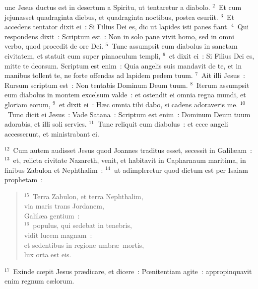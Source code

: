 \bchapter
{}unc Jesus ductus est in desertum a Spiritu, ut tentaretur a diabolo.
${}^{2}$~Et cum jejunasset quadraginta diebus, et quadraginta noctibus, postea esuriit.
${}^{3}$~Et accedens tentator dixit ei~: Si Filius Dei es, dic ut lapides isti panes fiant.
${}^{4}$~Qui respondens dixit~: Scriptum est~: Non in solo pane vivit homo, sed in omni verbo, quod procedit de ore Dei.
${}^{5}$~Tunc assumpsit eum diabolus in sanctam civitatem, et statuit eum super pinnaculum templi,
${}^{6}$~et dixit ei~: Si Filius Dei es, mitte te deorsum. Scriptum est enim~: Quia angelis suis mandavit de te, et in manibus tollent te, ne forte offendas ad lapidem pedem tuum.
${}^{7}$~Ait illi Jesus~: Rursum scriptum est~: Non tentabis Dominum Deum tuum.
${}^{8}$~Iterum assumpsit eum diabolus in montem excelsum valde~: et ostendit ei omnia regna mundi, et gloriam eorum,
${}^{9}$~et dixit ei~: H\ae c omnia tibi dabo, si cadens adoraveris me.
${}^{10}$~Tunc dicit ei Jesus~: Vade Satana~: Scriptum est enim~: Dominum Deum tuum adorabis, et illi soli servies.
${}^{11}$~Tunc reliquit eum diabolus~: et ecce angeli accesserunt, et ministrabant ei.


${}^{12}$~Cum autem audisset Jesus quod Joannes traditus esset, secessit in Galil\ae am~:
${}^{13}$~et, relicta civitate Nazareth, venit, et habitavit in Capharnaum maritima, in finibus Zabulon et Nephthalim~:
${}^{14}$~ut adimpleretur quod dictum est per Isaiam prophetam~:
\begin{flushleft}\begin{verse}${}^{15}$~Terra Zabulon, et terra Nephthalim,\\ via maris trans Jordanem,\\ Galil\ae a gentium~:\\
${}^{16}$~populus, qui sedebat in tenebris,\\ vidit lucem magnam~:\\ et sedentibus in regione umbr\ae\ mortis,\\ lux orta est eis.\end{verse}\end{flushleft}


${}^{17}$~Exinde cœpit Jesus pr\ae dicare, et dicere~: Pœnitentiam agite~: appropinquavit enim regnum c\ae lorum.


